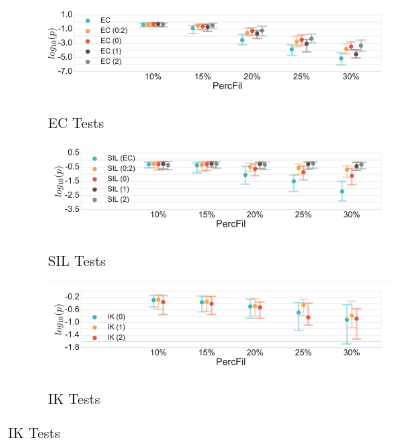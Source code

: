 \documentclass[12pt]{article}
\begin{document}
\begin{center}
  \begin{figure}[htp!]
    \centering
    \begin{subfigure}{.47\textwidth}
      \centering
      \caption{EC Tests}
      \includegraphics[height = .78in]{figure_8_euler_group.pdf} 
      \label{fig:sub_euler}
    \end{subfigure}
    \begin{subfigure}{.47\textwidth}
      \centering
      \caption{SIL Tests}
      \includegraphics[height = .78in]{figure_8_silhouette_group.pdf}
      \label{fig:sub_silh}
    \end{subfigure}
    \begin{subfigure}{.47\textwidth}
      \centering
      \caption{IK Tests}
      \includegraphics[height = .78in]{figure_8_contour_group.pdf}
      \label{fig:sub_contour}
    \end{subfigure}

\end{figure}
\end{center}
\end{document}
